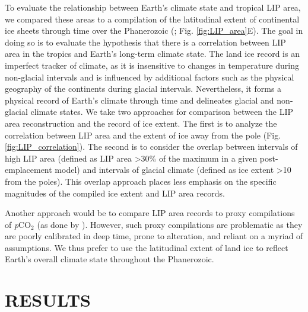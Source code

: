 \documentclass[11pt,letterpaper]{article}
\begin{document}
To evaluate the relationship between Earth's climate state and tropical LIP area, we compared these areas to a compilation of the latitudinal extent of continental ice sheets through time over the Phanerozoic (\citealp{Macdonald2018a}; Fig. \ref{fig:LIP_area}E). The goal in doing so is to evaluate the hypothesis that there is a correlation between LIP area in the tropics and Earth's long-term climate state. The land ice record is an imperfect tracker of climate, as it is insensitive to changes in temperature during non-glacial intervals and is influenced by additional factors such as the physical geography of the continents during glacial intervals. Nevertheless, it forms a physical record of Earth's climate through time and delineates glacial and non-glacial climate states. We take two approaches for comparison between the LIP area reconstruction and the record of ice extent. The first is to analyze the correlation between LIP area and the extent of ice away from the pole (Fig. \ref{fig:LIP_correlation}). The second is to consider the overlap between intervals of high LIP area (defined as LIP area \textgreater30\% of the maximum in a given post-emplacement model) and intervals of glacial climate (defined as ice extent \textgreater10\textdegree\xspace from the poles). This overlap approach places less emphasis on the specific magnitudes of the compiled ice extent and LIP area records.

Another approach would be to compare LIP area records to proxy compilations of \textit{p}CO$_2$ (as done by \citealp{Johansson2018a}). However, such proxy compilations are problematic as they are poorly calibrated in deep time, prone to alteration, and reliant on a myriad of assumptions. We thus prefer to use the latitudinal extent of land ice to reflect Earth's overall climate state throughout the Phanerozoic.

\section*{RESULTS}
\end{document}
